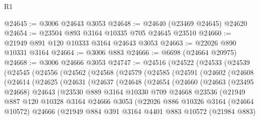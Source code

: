 \begin{lexlean}{R1}
\begin{coremodule}
@24645 := @3006 @24643 @3053
@24648 := @24640 (@23469 @24645) @24620
@24654 := @23504 @893 @3164 @10335 @705 @24645 @23510
@24660 := @21949 @891 @120 @10333 @3164 @24643 @3053
@24663 := @22026 @890 @10331 @3164
@24664 := @3006 @883
@24666 := @6698 (@24664 @20975)
@24668 := @3006 @24666 @3053
@24747 := @24516
    (@24522
      (@24533
        (@24539
          (@24545
            (@24556
              (@24562
                (@24568
                  (@24579
                    (@24585
                      (@24591
                        (@24602
                          (@24608
                            (@24614
                              (@24625
                                (@24631
                                  (@24637
                                    (@24648
                                      (@24654
                                        (@24660
                                          (@24663
                                            (@23495 @24668)
                                            @24643
                                            (@23530
                                              @889
                                              @3164
                                              @10330
                                              @709
                                              @24668
                                              @23536
                                              (@21949
                                                @887
                                                @120
                                                @10328
                                                @3164
                                                @24666
                                                @3053
                                                (@22026
                                                  @886
                                                  @10326
                                                  @3164
                                                  (@24664 @10572)
                                                  @24666
                                                  (@21949
                                                    @884
                                                    @391
                                                    @3164
                                                    @4401
                                                    @883
                                                    @10572
                                                    (@21984 @883)

\end{coremodule}
\end{lexlean}
